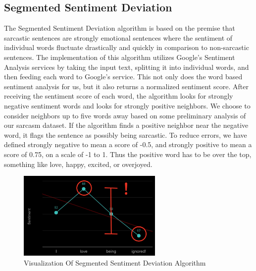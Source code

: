 \documentclass[conference]{IEEEtran}
\begin{document}
\subsection{Segmented Sentiment Deviation}
The Segmented Sentiment Deviation algorithm is based on the premise that sarcastic sentences are strongly emotional sentences where the sentiment of individual words fluctuate drastically and quickly in comparison to non-sarcastic sentences. The implementation of this algorithm utilizes Google’s Sentiment Analysis services by taking the input text, splitting it into individual words, and then feeding each word to Google’s service. This not only does the word based sentiment analysis for us, but it also returns a normalized sentiment score. After receiving the sentiment score of each word, the algorithm looks for strongly negative sentiment words and looks for strongly positive neighbors. We choose to consider neighbors up to five words away based on some preliminary analysis of our sarcasm dataset. If the algorithm finds a positive neighbor near the negative word, it flags the sentence as possibly being sarcastic. To reduce errors, we have defined strongly negative to mean a score of -0.5, and strongly positive to mean a score of 0.75, on a scale of -1 to 1. Thus the positive word has to be over the top, something like love, happy, excited, or overjoyed. \\

\begin{figure}[htbp]
\centerline{\includegraphics[width=7cm]{Screen Shot 2020-11-30 at 5.02.56 PM.png}}
\caption{Visualization Of Segmented Sentiment Deviation Algorithm}
\label{fig7}
\end{figure}
\end{document}
